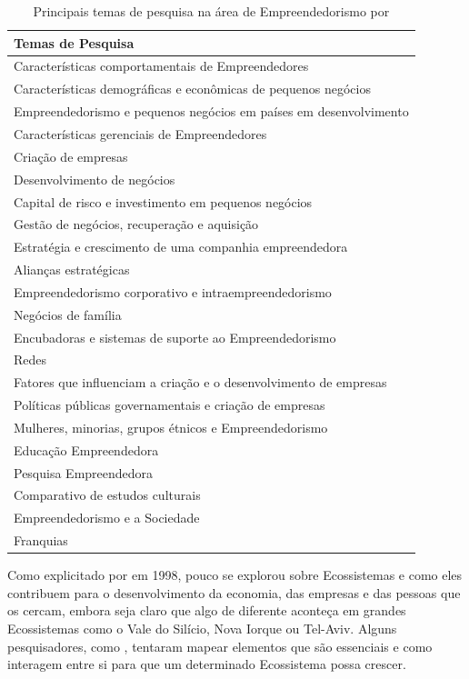\begin{table}[!htb]
	\centering
	\begin{tabular}{ | p{15cm} |}
		\hline
		Temas de Pesquisa \\ \hline
		Características comportamentais de Empreendedores \\ \hline
		Características demográficas e econômicas de pequenos negócios \\ \hline
		Empreendedorismo e pequenos negócios em países em desenvolvimento \\ \hline
		Características gerenciais de Empreendedores \\ \hline
		Criação de empresas \\ \hline
		Desenvolvimento de negócios \\ \hline
		Capital de risco e investimento em pequenos negócios \\ \hline
		Gestão de negócios, recuperação e aquisição \\ \hline
		Estratégia e crescimento de uma companhia empreendedora \\ \hline
		Alianças estratégicas \\ \hline
		Empreendedorismo corporativo e intraempreendedorismo \\ \hline
		Negócios de família \\ \hline
		Encubadoras e sistemas de suporte ao Empreendedorismo \\ \hline
		Redes \\ \hline
		Fatores que influenciam a criação e o desenvolvimento de empresas \\ \hline
		Políticas públicas governamentais e criação de empresas \\ \hline
		Mulheres, minorias, grupos étnicos e Empreendedorismo \\ \hline
		Educação Empreendedora \\ \hline
		Pesquisa Empreendedora \\ \hline
		Comparativo de estudos culturais\\ \hline
		Empreendedorismo e a Sociedade \\ \hline
		Franquias \\ \hline
	\end{tabular}
	\caption{Principais temas de pesquisa na área de Empreendedorismo por \cite{Filion1998}}
	\label{table:principais_temas_de_pesquisa_na_area_de_empreendedorismo}
\end{table}

Como explicitado por  em 1998, pouco se explorou sobre Ecossistemas e como eles contribuem para o desenvolvimento da economia, das empresas e das pessoas que os cercam, embora seja claro que algo de diferente aconteça em grandes Ecossistemas como o Vale do Silício, Nova Iorque ou Tel-Aviv. Alguns pesquisadores, como , tentaram mapear elementos que são essenciais e como interagem entre si para que um determinado Ecossistema possa crescer.

